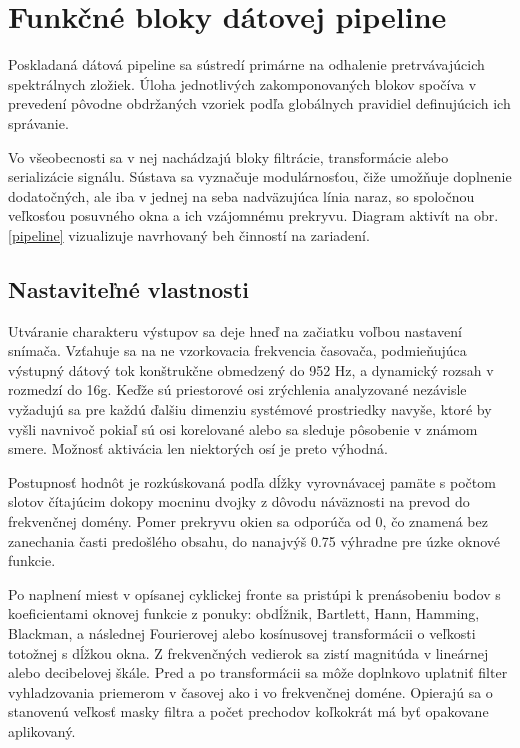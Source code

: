 \section{Funkčné bloky dátovej pipeline}
Poskladaná dátová pipeline sa sústredí primárne na odhalenie pretrvávajúcich spektrálnych zložiek. Úloha jednotlivých 
zakomponovaných blokov spočíva v prevedení pôvodne obdržaných vzoriek podľa globálnych pravidiel definujúcich ich správanie. 

Vo všeobecnosti sa v nej nachádzajú bloky filtrácie, transformácie alebo serializácie signálu. Sústava sa 
vyznačuje modulárnosťou, čiže umožňuje doplnenie dodatočných, ale iba v jednej na seba nadväzujúca
línia naraz, so spoločnou veľkosťou posuvného okna a ich vzájomnému prekryvu. Diagram aktivít na obr. \ref{pipeline}
vizualizuje navrhovaný beh činností na zariadení.

\subsection{Nastaviteľné vlastnosti}
Utváranie charakteru výstupov sa deje hneď na začiatku voľbou nastavení snímača.
Vzťahuje sa na ne vzorkovacia frekvencia časovača, podmieňujúca výstupný dátový tok konštrukčne obmedzený do 952 Hz, 
a dynamický rozsah v rozmedzí do 16g. Keďže sú priestorové osi zrýchlenia analyzované nezávisle vyžadujú sa pre každú ďalšiu
dimenziu systémové prostriedky navyše, ktoré by vyšli navnivoč pokiaľ sú osi korelované alebo sa sleduje pôsobenie v 
známom smere. Možnosť aktivácia len niektorých osí je preto výhodná.

Postupnosť hodnôt je rozkúskovaná podľa dĺžky vyrovnávacej pamäte s počtom slotov čítajúcim dokopy mocninu dvojky
z dôvodu náväznosti na prevod do frekvenčnej domény. Pomer prekryvu okien sa odporúča od 0, čo znamená bez zanechania časti predošlého 
obsahu, do nanajvýš 0.75 výhradne pre úzke oknové funkcie.

Po naplnení miest v opísanej cyklickej fronte sa pristúpi k prenásobeniu bodov s koeficientami oknovej funkcie 
z ponuky: obdĺžnik, Bartlett, Hann, Hamming, Blackman, a následnej Fourierovej alebo kosínusovej transformácii o veľkosti totožnej s dĺžkou 
okna. Z frekvenčných vedierok sa zistí magnitúda v lineárnej alebo decibelovej škále. 
Pred a po transformácii sa môže doplnkovo uplatniť filter vyhladzovania priemerom v časovej ako i vo frekvenčnej doméne.
Opierajú sa o stanovenú veľkosť masky filtra a počet prechodov koľkokrát má byť opakovane aplikovaný.

